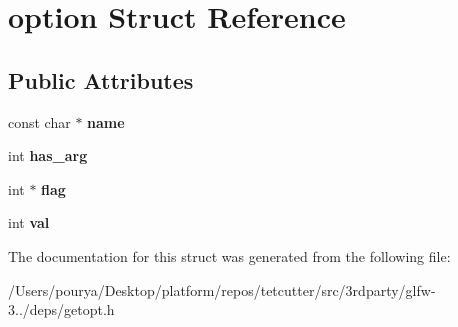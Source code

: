 \hypertarget{structoption}{}\section{option Struct Reference}
\label{structoption}
\subsection*{Public Attributes}
\begin{DoxyCompactItemize}
\item 
\hypertarget{structoption_adc503659d37af8017fb4b86d61c99086}{}const char $\ast$ {\bfseries name}\label{structoption_adc503659d37af8017fb4b86d61c99086}

\item 
\hypertarget{structoption_a90d7ee9a51eea5c002682dbd0af149e4}{}int {\bfseries has\+\_\+arg}\label{structoption_a90d7ee9a51eea5c002682dbd0af149e4}

\item 
\hypertarget{structoption_ab366eea5fe7be25c1928328ba715e353}{}int $\ast$ {\bfseries flag}\label{structoption_ab366eea5fe7be25c1928328ba715e353}

\item 
\hypertarget{structoption_a13bd155ec3b405d29c41ab8d0793be11}{}int {\bfseries val}\label{structoption_a13bd155ec3b405d29c41ab8d0793be11}

\end{DoxyCompactItemize}


The documentation for this struct was generated from the following file\+:\begin{DoxyCompactItemize}
\item 
/\+Users/pourya/\+Desktop/platform/repos/tetcutter/src/3rdparty/glfw-\/3../deps/getopt.\+h\end{DoxyCompactItemize}

